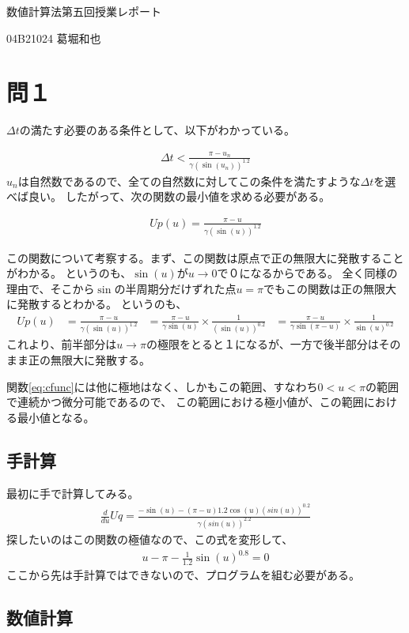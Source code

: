 \documentclass{ltjsarticle}
\begin{document}
\Huge
    数値計算法第五回授業レポート

    04B21024
    葛堀和也
\clearpage

\section{問１}
$\Delta t$の満たす必要のある条件として、以下がわかっている。

\begin{align}
    \Delta t < \frac{\pi - u_{n}}{\gamma (\sin(u_{n}))^{1.2}}
    \label{eq:base}
\end{align}
$u_{n}$は自然数であるので、全ての自然数に対してこの条件を満たすような$\Delta t$を選べば良い。
したがって、次の関数の最小値を求める必要がある。

\begin{align}
    Up(u) = \frac{\pi - u}{\gamma (\sin(u))^{1.2}}
    \label{eq:cfunc}
\end{align}


この関数について考察する。まず、この関数は原点で正の無限大に発散することがわかる。
というのも、$\sin(u)$が$u \rightarrow 0$で０になるからである。
全く同様の理由で、そこから$\sin$の半周期分だけずれた点$u=\pi$でもこの関数は正の無限大に発散するとわかる。
というのも、
\begin{align}
    Up(u) &= \frac{\pi - u}{\gamma (\sin(u))^{1.2}}
          &= \frac{\pi - u}{\gamma \sin(u)}  \times \frac{1}{(\sin(u))^{0.2}}
          &= \frac{\pi - u}{\gamma \sin(\pi -u)} \times \frac{1}{\sin(u)^{0.2}}
\end{align}
これより、前半部分は$u \rightarrow \pi$の極限をとると１になるが、一方で後半部分はそのまま正の無限大に発散する。

関数\ref{eq:cfunc}には他に極地はなく、しかもこの範囲、すなわち$0<u<\pi$の範囲で連続かつ微分可能であるので、
この範囲における極小値が、この範囲における最小値となる。

\subsection{手計算}
最初に手で計算してみる。
\begin{align}
    \frac{d}{du}Uq = \frac{-\sin(u) - (\pi -u )1.2 \cos(u)(sin(u))^{0.2}}{\gamma (sin(u))^{2.2}}
\end{align}
探したいのはこの関数の極値なので、この式を変形して、
\begin{align}
    u-\pi -\frac{1}{1.2}\sin(u)^{0.8}=0
\end{align}
ここから先は手計算ではできないので、プログラムを組む必要がある。


\subsection{数値計算}
\end{document}
